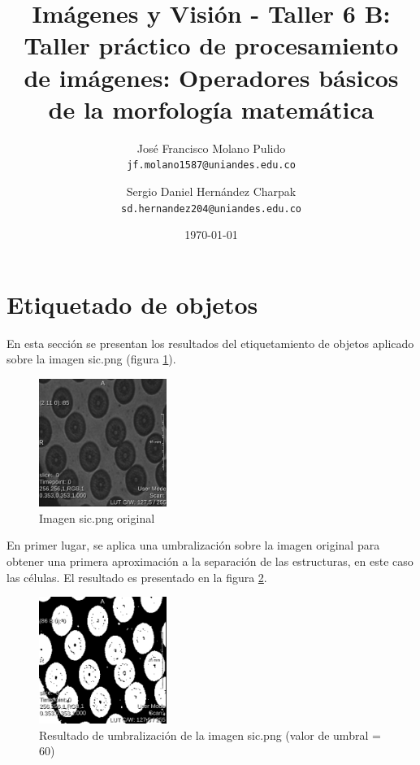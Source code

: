 \documentclass{article}
\title{Im\'{a}genes y Visi\'{o}n - Taller 6 B: Taller pr\'{a}ctico de procesamiento de im\'{a}genes: Operadores b\'{a}sicos de la morfolog\'{i}a matem\'{a}tica} %
\author{
  Jos\'{e} Francisco Molano Pulido\\
  \texttt{jf.molano1587@uniandes.edu.co}
  \and
  Sergio Daniel Hern\'{a}ndez Charpak\\
  \texttt{sd.hernandez204@uniandes.edu.co}
}
\date{\today} %
\begin{document}
\maketitle %

\tableofcontents

\newpage
\section{Etiquetado de objetos}

En esta secci\'{o}n se presentan los resultados del etiquetamiento de objetos aplicado sobre la imagen sic.png (figura \ref{fg:original}).

\begin{figure}[ht]
\begin{center}
\includegraphics[width=0.37\textwidth]{1Etiquetado/1_img1} %
\caption{Imagen sic.png original}
\label{fg:original}
\end{center}
\end{figure}
\FloatBarrier

En primer lugar, se aplica una umbralizaci\'{o}n sobre la imagen original para obtener una primera aproximaci\'{o}n a la separaci\'{o}n de las estructuras, en este caso las c\'{e}lulas. El resultado es presentado en la figura \ref{fg:segmentada}.

\begin{figure}[ht]
\begin{center}
\includegraphics[width=0.37\textwidth]{1Etiquetado/1_img2} %
\caption{Resultado de umbralizaci\'{o}n de la imagen sic.png (valor de umbral = 60)}
\label{fg:segmentada}
\end{center}
\end{figure}
\FloatBarrier
\end{document}
